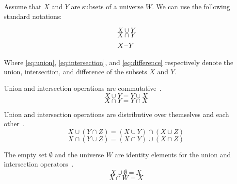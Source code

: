 \documentclass[a4paper,11pt,oneside]{article}
\newcommand{\minus}{\scalebox{0.9}[1.0]{$-$}} %
\begin{document}
\begin{definition}
	Assume that $X$ and $Y$ are subsets of a universe $W$. We can use the following standard notations:
			      
	\begin{equation} \label{eq:union}
		X \cup Y
	\end{equation}
	\begin{equation} \label{eq:intersection}
		X \cap Y
	\end{equation}
	\begin{equation} \label{eq:difference}
		X \minus Y
	\end{equation}
			        
	Where \eqref{eq:union}, \eqref{eq:intersection}, and \eqref{eq:difference} respectively denote the union, intersection, and difference of the subsets $X$ and $Y$.	        
\end{definition}

\begin{property}
	\label{prop:3.1}
	Union and intersection operations are commutative~\cite{mansfield_1987}.
	\begin{equation*}
		X \cup Y = Y \cup X
	\end{equation*}
	\begin{equation*}
		X \cap Y = Y \cap X
	\end{equation*}
\end{property}
        
\begin{property}
	\label{prop:3.2}
	Union and intersection operations are distributive over themselves and each other~\cite{mansfield_1987}.
	\begin{equation*}
		X \cup (Y \cap Z) = (X \cup Y) \cap (X \cup Z)
	\end{equation*}
	\begin{equation*}
		X \cap (Y \cup Z) = (X \cap Y) \cup (X \cap Z)
	\end{equation*}
\end{property}
        
\begin{property}
	\label{prop:3.3}
	The empty set $\emptyset$ and the universe $W$ are identity elements for the union and intersection operators~\cite{mansfield_1987}.
	\begin{equation*}
		X \cup \emptyset = X
	\end{equation*}
	\begin{equation*}
		X \cap W = X
	\end{equation*}
\end{property}
        
\end{document}
